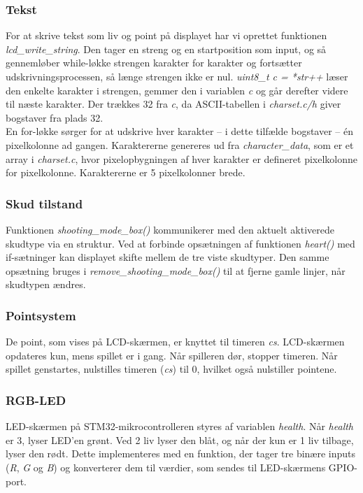 \subsubsection{Tekst}
For at skrive tekst som liv og point på displayet har vi oprettet funktionen \textit{lcd\_write\_string}. Den tager en streng og en startposition som input, og så gennemløber while-løkke strengen karakter for karakter og fortsætter udskrivningsprocessen, så længe strengen ikke er nul. \textit{uint8\_t c = *str++} læser den enkelte karakter i strengen, gemmer den i variablen \textit{c} og går derefter videre til næste karakter. Der trækkes 32 fra \textit{c}, da ASCII-tabellen i \textit{charset.c/h} giver bogstaver fra plads 32.\\
En for-løkke sørger for at udskrive hver karakter – i dette tilfælde bogstaver – én pixelkolonne ad gangen. Karaktererne genereres ud fra \textit{character\_data}, som er et array i \textit{charset.c}, hvor pixelopbygningen af hver karakter er defineret pixelkolonne for pixelkolonne. Karaktererne er 5 pixelkolonner brede.

\subsubsection{Skud tilstand}
Funktionen \textit{shooting\_mode\_box()} kommunikerer med den aktuelt aktiverede skudtype via en struktur. Ved at forbinde opsætningen af funktionen \textit{heart()} med if-sætninger kan displayet skifte mellem de tre viste skudtyper. Den samme opsætning bruges i \textit{remove\_shooting\_mode\_box()} til at fjerne gamle linjer, når skudtypen ændres.

\subsubsection{Pointsystem}
De point, som vises på LCD-skærmen, er knyttet til timeren \textit{cs}. LCD-skærmen opdateres kun, mens spillet er i gang. Når spilleren dør, stopper timeren. Når spillet genstartes, nulstilles timeren (\textit{cs}) til 0, hvilket også nulstiller pointene.

\subsubsection{RGB-LED}
LED-skærmen på STM32-mikrocontrolleren styres af variablen \textit{health}. Når \textit{health} er 3, lyser LED’en grønt. Ved 2 liv lyser den blåt, og når der kun er 1 liv tilbage, lyser den rødt. Dette implementeres med en funktion, der tager tre binære inputs (\textit{R}, \textit{G} og \textit{B}) og konverterer dem til værdier, som sendes til LED-skærmens GPIO-port.